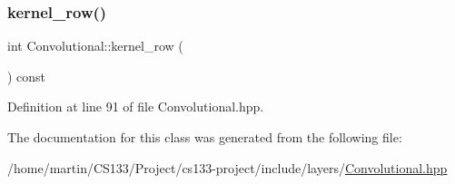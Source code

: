 \subsubsection{\texorpdfstring{kernel\+\_\+row()}{kernel\_row()}}
{\footnotesize\ttfamily int Convolutional\+::kernel\+\_\+row (\begin{DoxyParamCaption}{ }\end{DoxyParamCaption}) const}



Definition at line 91 of file Convolutional.\+hpp.



The documentation for this class was generated from the following file\+:\begin{DoxyCompactItemize}
\item 
/home/martin/\+C\+S133/\+Project/cs133-\/project/include/layers/\hyperlink{convolutional_8hpp}{Convolutional.\+hpp}\end{DoxyCompactItemize}

